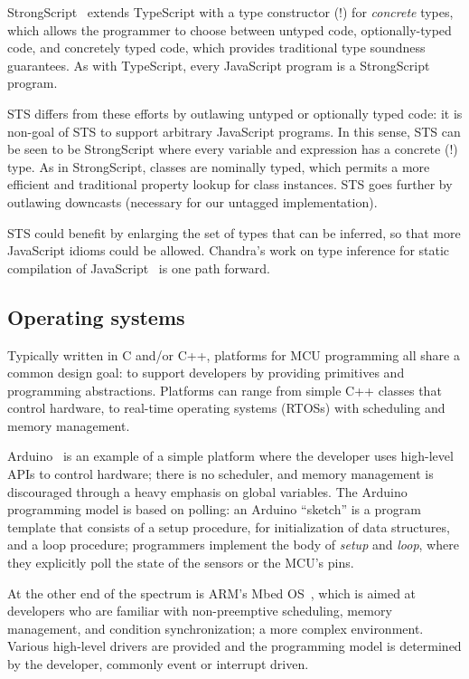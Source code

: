 StrongScript~\cite{StrongScriptECOOP15} extends TypeScript with a type constructor (!)
for \emph{concrete} types, which allows the programmer to choose between untyped
code, optionally-typed code, and concretely typed code, which provides traditional
type soundness guarantees. As with TypeScript, every JavaScript program is a StrongScript program. 

STS differs from these efforts by outlawing untyped or optionally typed
code: it is non-goal of STS to support arbitrary JavaScript programs.
In this sense, STS can be seen to be StrongScript where every variable and 
expression has a concrete (!) type. As in StrongScript, classes are nominally typed,
which permits a more efficient and traditional property lookup for class instances. 
STS goes further by outlawing downcasts (necessary for our untagged 
implementation).

STS could benefit by enlarging the set of types
that can be inferred, so that more JavaScript idioms could be allowed. 
Chandra's work on type inference for static compilation of 
JavaScript~\cite{ChandraOOPSLA2016} is one path forward. 

\subsection{Operating systems}

Typically written in C and/or C++, platforms for MCU programming all share 
a common design goal: to support developers by providing primitives and programming 
abstractions. Platforms can range from simple C++ classes that control hardware, 
to real-time operating systems (RTOSs) with scheduling and memory management.

Arduino~\cite{buildingArduino2014} is an example of a simple platform where the developer uses 
high-level APIs to control hardware; there is no scheduler, and memory management 
is discouraged through a heavy emphasis on global variables.  The Arduino programming 
model is based on polling: an Arduino ``sketch'' is a program template that consists 
of a setup procedure, for initialization of data structures, and a loop procedure; 
programmers implement the body of \textit{setup} and \textit{loop}, where they explicitly 
poll the state of the sensors or the MCU's pins.

At the other end of the spectrum is ARM's Mbed OS~\cite{ARMmbed}, which is aimed at developers who are familiar 
with non-preemptive scheduling, memory management, and condition synchronization; a more 
complex environment. Various high-level drivers are provided and the programming model 
is determined by the developer, commonly event or interrupt driven.

